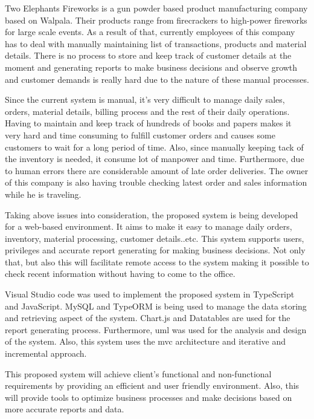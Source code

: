 \documentclass[12pt]{report}
\begin{document}
Two Elephants Fireworks is a gun powder based product manufacturing company based on Walpala. Their products range from
firecrackers to high-power fireworks for large scale events. As a result of that, currently employees of this company has to deal with manually maintaining list of transactions, products and material details. There is no process to store and keep track of customer details at the moment and generating reports to make business decisions and observe growth and customer demands is really hard due to the nature of these manual processes.

Since the current system is manual, it’s very difficult to manage daily sales, orders, material details, billing process and the rest of their daily operations. Having to maintain and keep track of hundreds of books and papers makes it very hard and time consuming to fulfill customer orders and causes some customers to wait for a long period of time. Also, since manually keeping tack of the inventory is needed, it consume lot of manpower and time. Furthermore, due to human errors there are considerable amount of late order  deliveries. The owner of this company is also having trouble checking latest order and sales information while he is traveling.

Taking above issues into consideration, the proposed system  is being developed for a web-based environment. It aims to make it easy to manage daily orders, inventory, material processing, customer details..etc. This system supports users, privileges and accurate report generating for making business decisions. Not only that, but also this will facilitate remote access to the system making it possible to check recent information without having to come to the office.

Visual Studio code was used to implement the proposed system in TypeScript and JavaScript. MySQL and TypeORM is being used to manage the data storing and retrieving aspect of the system. Chart.js and Datatables are used for the report generating process. Furthermore, \acrlong{uml} was used for the analysis and design of the system. Also, this system uses the \acrshort{mvc} architecture and iterative and incremental approach.

This proposed system will achieve client's functional and non-functional requirements by providing an efficient and user friendly environment. Also, this will provide tools to optimize business processes and make decisions based on more accurate reports and data.

\newpage
{}
\begin{singlespacing}
	\tableofcontents
\end{singlespacing}
\setlength{\parskip}{1em}
\renewcommand{\baselinestretch}{2.0}
\end{document}
